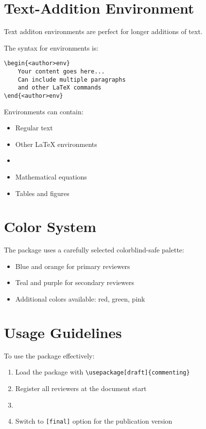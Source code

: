 \documentclass{article}
\begin{document}
\section{Text-Addition Environment}
Text additon environments are perfect for longer additions of text.

\begin{aliceenv}
The syntax for environments is:

\begin{verbatim}
\begin{<author>env}
    Your content goes here...
    Can include multiple paragraphs
    and other LaTeX commands
\end{<author>env}
\end{verbatim}
\end{aliceenv}

\begin{bobenv}
Environments can contain:
\begin{itemize}
    \item Regular text
    \item Other LaTeX environments
    \item {}
    \item Mathematical equations
    \item Tables and figures
\end{itemize}
\end{bobenv}

\section{Color System}
The package uses a carefully selected colorblind-safe palette:

\begin{itemize}
    \item \textcolor{cbBlue}{Blue} and \textcolor{cbOrange}{orange} for primary reviewers
    \item \textcolor{cbTeal}{Teal} and \textcolor{cbPurple}{purple} for secondary reviewers
    \item Additional colors available: \textcolor{cbRed}{red}, \textcolor{cbGreen}{green}, 
    \textcolor{cbPink}{pink}
\end{itemize}

\section{Usage Guidelines}
To use the package effectively:
\begin{enumerate}
    \item Load the package with \verb|\usepackage[draft]{commenting}|
    \item Register all reviewers at the document start
    \item {}
    \item Switch to \verb|[final]| option for the publication version
\end{enumerate}
\end{document}
